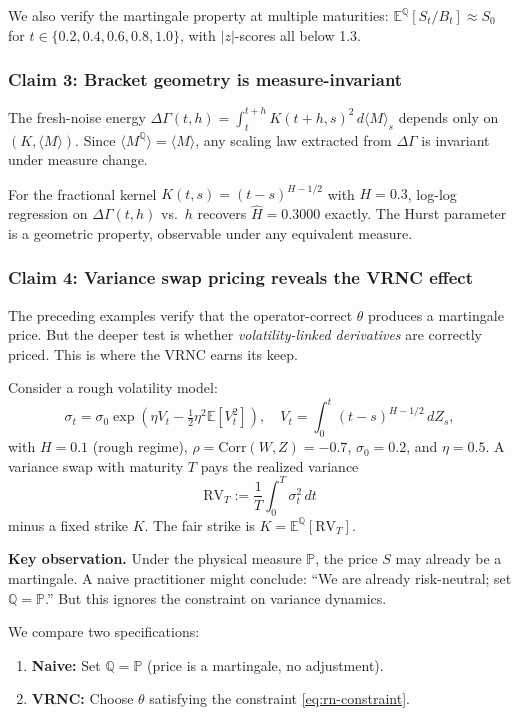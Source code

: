 \documentclass[11pt]{article}
\theoremstyle{plain}
\theoremstyle{definition}
\theoremstyle{remark}
\newcommand{\E}{\mathbb{E}}
\newcommand{\PP}{\mathbb{P}}
\newcommand{\QQ}{\mathbb{Q}}
\newcommand{\dGamma}{\Delta\Gamma}
\newcommand{\bracket}[1]{\langle #1 \rangle}
\begin{document}
We also verify the martingale property at multiple maturities:
$\E^{\QQ}[S_t/B_t] \approx S_0$ for $t \in \{0.2, 0.4, 0.6, 0.8, 1.0\}$,
with $|z|$-scores all below 1.3.

\subsubsection{Claim 3: Bracket geometry is measure-invariant}

The fresh-noise energy $\dGamma(t,h) = \int_t^{t+h} K(t+h,s)^2\,d\bracket{M}_s$
depends only on $(K, \bracket{M})$. Since $\bracket{M^{\QQ}} = \bracket{M}$,
any scaling law extracted from $\dGamma$ is invariant under measure change.

For the fractional kernel $K(t,s) = (t-s)^{H-1/2}$ with $H = 0.3$, log-log
regression on $\dGamma(t,h)$ vs.\ $h$ recovers $\hat{H} = 0.3000$ exactly.
The Hurst parameter is a geometric property, observable under any equivalent
measure.

\subsubsection{Claim 4: Variance swap pricing reveals the VRNC effect}

The preceding examples verify that the operator-correct $\theta$ produces a
martingale price. But the deeper test is whether \emph{volatility-linked
derivatives} are correctly priced. This is where the VRNC earns its keep.

Consider a rough volatility model:
\[
\sigma_t = \sigma_0 \exp\!\left(\eta V_t - \tfrac{1}{2}\eta^2 \E[V_t^2]\right),
\quad V_t = \int_0^t (t-s)^{H-1/2}\,dZ_s,
\]
with $H = 0.1$ (rough regime), $\rho = \text{Corr}(W, Z) = -0.7$, $\sigma_0 = 0.2$,
and $\eta = 0.5$. A variance swap with maturity $T$ pays the realized variance
\[
\text{RV}_T := \frac{1}{T}\int_0^T \sigma_t^2\,dt
\]
minus a fixed strike $K$. The fair strike is $K = \E^{\QQ}[\text{RV}_T]$.

\textbf{Key observation.} Under the physical measure $\PP$, the price $S$ may
already be a martingale. A naive practitioner might conclude: ``We are already
risk-neutral; set $\QQ = \PP$.'' But this ignores the constraint on variance dynamics.

We compare two specifications:
\begin{enumerate}[label=(\alph*)]
\item \textbf{Naive:} Set $\QQ = \PP$ (price is a martingale, no adjustment).
\item \textbf{VRNC:} Choose $\theta$ satisfying the constraint \eqref{eq:rn-constraint}.
\end{enumerate}
\end{document}
